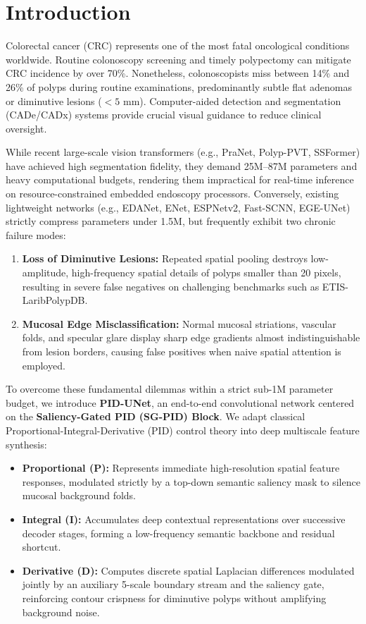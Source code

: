 \documentclass[conference]{IEEEtran}
\begin{document}
\section{Introduction}
Colorectal cancer (CRC) represents one of the most fatal oncological conditions worldwide. Routine colonoscopy screening and timely polypectomy can mitigate CRC incidence by over 70\%. Nonetheless, colonoscopists miss between 14\% and 26\% of polyps during routine examinations, predominantly subtle flat adenomas or diminutive lesions ($<5$ mm). Computer-aided detection and segmentation (CADe/CADx) systems provide crucial visual guidance to reduce clinical oversight.

While recent large-scale vision transformers (e.g., PraNet, Polyp-PVT, SSFormer) have achieved high segmentation fidelity, they demand 25M--87M parameters and heavy computational budgets, rendering them impractical for real-time inference on resource-constrained embedded endoscopy processors. Conversely, existing lightweight networks (e.g., EDANet, ENet, ESPNetv2, Fast-SCNN, EGE-UNet) strictly compress parameters under 1.5M, but frequently exhibit two chronic failure modes:
\begin{enumerate}
    \item \textbf{Loss of Diminutive Lesions:} Repeated spatial pooling destroys low-amplitude, high-frequency spatial details of polyps smaller than 20 pixels, resulting in severe false negatives on challenging benchmarks such as ETIS-LaribPolypDB.
    \item \textbf{Mucosal Edge Misclassification:} Normal mucosal striations, vascular folds, and specular glare display sharp edge gradients almost indistinguishable from lesion borders, causing false positives when naive spatial attention is employed.
\end{enumerate}

To overcome these fundamental dilemmas within a strict sub-1M parameter budget, we introduce \textbf{PID-UNet}, an end-to-end convolutional network centered on the \textbf{Saliency-Gated PID (SG-PID) Block}. We adapt classical Proportional-Integral-Derivative (PID) control theory into deep multiscale feature synthesis:
\begin{itemize}
    \item \textbf{Proportional (P):} Represents immediate high-resolution spatial feature responses, modulated strictly by a top-down semantic saliency mask to silence mucosal background folds.
    \item \textbf{Integral (I):} Accumulates deep contextual representations over successive decoder stages, forming a low-frequency semantic backbone and residual shortcut.
    \item \textbf{Derivative (D):} Computes discrete spatial Laplacian differences modulated jointly by an auxiliary 5-scale boundary stream and the saliency gate, reinforcing contour crispness for diminutive polyps without amplifying background noise.
\end{itemize}
\end{document}
